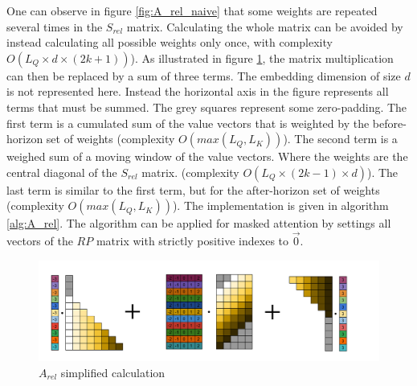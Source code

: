 One can observe in figure \ref{fig:A_rel_naive} that some weights are repeated several times in the
$S_{rel}$ matrix. Calculating the whole matrix can be avoided by
instead calculating all possible weights only once, with complexity
$O \left(L_Q\times d\times(2k+1)\right)$). As illustrated in figure \ref{fig:A_rel_linear}, the matrix multiplication can then be replaced by a sum of three terms. The embedding dimension of size $d$ is not represented here. Instead the horizontal axis in the figure represents all terms that must be summed. The grey squares represent some zero-padding. The first term is a cumulated sum of the value vectors that is weighted  by the before-horizon set of weights (complexity $O(max(L_Q, L_K))$). The second term is a weighed sum of a moving window of the value vectors. Where the weights are the central diagonal of the $S_{rel}$ matrix. (complexity $O(L_Q \times (2k-1) \times d)$). The last term is similar to the first term, but for the after-horizon set of weights (complexity $O(max(L_Q, L_K))$). The implementation is given in algorithm \ref{alg:A_rel}. The algorithm can be applied for masked attention by settings all vectors of the $RP$ matrix with strictly positive indexes to $\vec{0}$.

\begin{figure}
\centering
\includegraphics[width=0.9\linewidth]{images/S_rel_V_detailed.png}
\caption{$A_{rel}$ simplified calculation}
\label{fig:A_rel_linear}
\end{figure}

